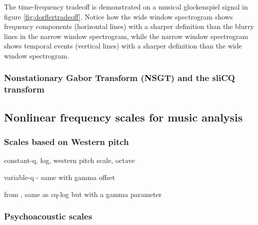 \documentclass[report.tex]{subfiles}
\begin{document}
The time-frequency tradeoff is demonstrated on a musical glockenspiel signal in figure \ref{fig:dorflertradeoff}. Notice how the wide window spectrogram shows frequency components (horizontal lines) with a sharper definition than the blurry lines in the narrow window spectrogram, while the narrow window spectrogram shows temporal events (vertical lines) with a sharper definition than the wide window spectrogram.

\subsubsection{Nonstationary Gabor Transform (NSGT) and the sliCQ transform}
\label{sec:theorynsgt}






\vfill
\clearpage

\subsection{Nonlinear frequency scales for music analysis}
\label{sec:freqscales}


\subsubsection{Scales based on Western pitch}

constant-q, log, western pitch scale, octave

variable-q - same with gamma offset

from \cite{variableq1, variableq2}, same as cq-log but with a gamma parameter

\subsubsection{Psychoacoustic scales}
\end{document}
